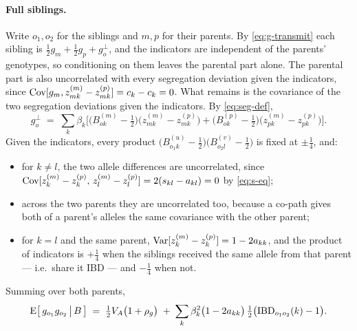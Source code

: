 \documentclass[12pt]{article}
\begin{document}
\paragraph{Full siblings.}
Write $o_1, o_2$ for the siblings and $m, p$ for their parents.
By \eqref{eq:g-transmit} each sibling is $\tfrac12 g_m + \tfrac12 g_p + g^\perp_o$, and the indicators are independent of the parents' genotypes, so conditioning on them leaves the parental part alone.
The parental part is also uncorrelated with every segregation deviation given the indicators, since $\mathrm{Cov}[g_m, z^{(m)}_{mk} - z^{(p)}_{mk}] = c_k - c_k = 0$.
What remains is the covariance of the two segregation deviations given the indicators.
By \eqref{eq:seg-def},
$$ g^\perp_o \;=\; \sum_k \beta_k\Big[\big(B^{(m)}_{ok} - \tfrac12\big)\big(z^{(m)}_{mk} - z^{(p)}_{mk}\big) + \big(B^{(p)}_{ok} - \tfrac12\big)\big(z^{(m)}_{pk} - z^{(p)}_{pk}\big)\Big] . $$
Given the indicators, every product $\big(B^{(u)}_{o_1k}-\tfrac12\big)\big(B^{(v)}_{o_2l}-\tfrac12\big)$ is fixed at $\pm\tfrac14$, and:
\begin{itemize}
    \item for $k \neq l$, the two allele differences are uncorrelated, since $\mathrm{Cov}[z^{(m)}_k - z^{(p)}_k,\, z^{(m)}_l - z^{(p)}_l] = 2(s_{kl} - a_{kl}) = 0$ by \eqref{eq:s-eq};
    \item across the two parents they are uncorrelated too, because a co-path gives both of a parent's alleles the same covariance with the other parent;
    \item for $k = l$ and the same parent, $\mathrm{Var}[z^{(m)}_k - z^{(p)}_k] = 1 - 2a_{kk}$, and the product of indicators is $+\tfrac14$ when the siblings received the same allele from that parent --- i.e.\ share it IBD --- and $-\tfrac14$ when not.
\end{itemize}
Summing over both parents,
\begin{equation}\label{eq:sib-given-meioses}
    \mathrm{E}\big[\,g_{o_1} g_{o_2} \,\big|\, B\,\big]
    \;=\; \tfrac12 V_A\big(1+\rho_g\big) \;+\; \sum_k \beta_k^2\big(1 - 2a_{kk}\big)\,\tfrac12\big(\mathrm{IBD}_{o_1o_2}(k) - 1\big) .
\end{equation}
\end{document}
